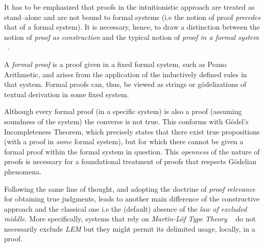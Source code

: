It has to be emphasized that proofs in the intuitionistic approach 
 are treated as stand--alone and are not bound to formal systems 
(i.e the notion of proof \textit{precedes} that of a formal system). 
It is necessary, hence, to draw a distinction between the notion of 
 \emph{proof as construction} and the typical notion of \emph{proof in a formal system} 
 ~\cite{Harper2013,Harper2012}.

A \emph{formal proof}
is a proof given in a fixed formal system, such as Peano Arithmetic, and arises
from the application of the inductively defined rules in that system. Formal proofs can, thus, be viewed as strings or g\"{o}delizations of textual derivation in some fixed system. 

Although every formal proof (in a specific system)
is also a proof (assuming soundness of the system) the converse is not true.  
This conforms with G\"{o}del's Incompleteness Theorem, which precisely states that there
exist true propositions (with a proof in \emph{some} formal system), but for which 
there cannot be given a formal proof within the formal system in question. 
This \emph{openness} of the nature of proofs is necessary for a foundational 
treatment of proofs that respects  G\"{o}delian phenomena.

Following the same line of thought, and adopting the doctrine of \emph{proof relevance} 
for obtaining true judgments, leads to another main difference of the constructive 
approach and the classical one i.e the (default) absence of the 
\emph{law of excluded middle}. More specifically, systems that rely on \emph{Martin-L\"{o}f Type Theory
}~\cite{martin1984intuitionistic} do not necessarily exclude \emph{LEM}
 but they might permit its delimited usage, locally, in a proof. 


